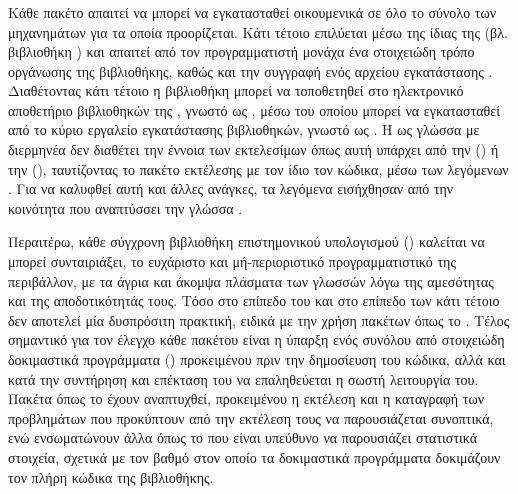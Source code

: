 \subsubsection{}
Κάθε πακέτο  απαιτεί να μπορεί να εγκατασταθεί οικουμενικά σε όλο το σύνολο των μηχανημάτων για τα οποία προορίζεται.
Κάτι τέτοιο επιλύεται μέσω της ίδιας της  (βλ. βιβλιοθήκη \href{https://pypi.org/project/setuptools/}{}) και απαιτεί από τον προγραμματιστή μονάχα ένα στοιχειώδη τρόπο οργάνωσης της βιβλιοθήκης, καθώς και την συγγραφή ενός αρχείου εγκατάστασης .
Διαθέτοντας κάτι τέτοιο η βιβλιοθήκη μπορεί να τοποθετηθεί στο ηλεκτρονικό αποθετήριο βιβλιοθηκών της , γνωστό ως , μέσω του οποίου μπορεί να εγκατασταθεί από το κύριο εργαλείο εγκατάστασης βιβλιοθηκών, γνωστό ως \href{https://pypi.org/project/pip/}{}.
Η  ως γλώσσα με διερμηνέα δεν διαθέτει την έννοια των εκτελεσίμων όπως αυτή υπάρχει από την  () ή την  (), ταυτίζοντας το πακέτο εκτέλεσης με τον ίδιο τον κώδικα, μέσω των λεγόμενων .
Για να καλυφθεί αυτή και άλλες ανάγκες, τα λεγόμενα \href{https://pythonwheels.com/}{} εισήχθησαν από την κοινότητα που αναπτύσσει την γλώσσα .\par
Περαιτέρω, κάθε σύγχρονη βιβλιοθήκη επιστημονικού υπολογισμού () καλείται να μπορεί συνταιριάξει, το ευχάριστο και μή-περιοριστικό προγραμματιστικό της περιβάλλον, με τα άγρια και άκομψα πλάσματα των γλωσσών  λόγω της αμεσότητας και της αποδοτικότητάς τους.
Τόσο στο επίπεδο του  και στο επίπεδο των  κάτι τέτοιο δεν αποτελεί μία δυσπρόσιτη πρακτική, ειδικά με την χρήση πακέτων όπως το \href{https://pypi.org/project/Cython/}{}.
Τέλος σημαντικό για τον έλεγχο κάθε πακέτου είναι η ύπαρξη ενός συνόλου από στοιχειώδη δοκιμαστικά προγράμματα () προκειμένου πριν την δημοσίευση του κώδικα, αλλά και κατά την συντήρηση και επέκταση του να επαληθεύεται η σωστή λειτουργία του.
Πακέτα όπως το \href{https://pypi.org/project/nose/}{} έχουν αναπτυχθεί, προκειμένου η εκτέλεση και η καταγραφή των προβλημάτων που προκύπτουν από την εκτέλεση τους να παρουσιάζεται συνοπτικά, ενώ ενσωματώνουν άλλα όπως το \href{https://pypi.org/project/coverage/}{} που είναι υπεύθυνο να παρουσιάζει στατιστικά στοιχεία, σχετικά με τον βαθμό στον οποίο τα δοκιμαστικά προγράμματα δοκιμάζουν τον πλήρη κώδικα της βιβλιοθήκης.

